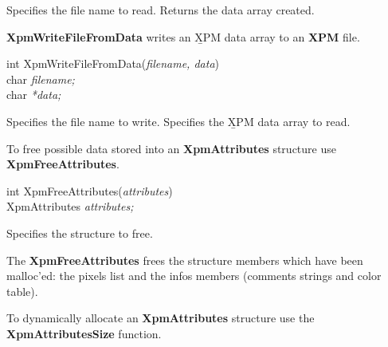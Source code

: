 \begin{description}

 Specifies the file name to read.
 Returns the data array created.

\end{description} 

\vspace{.5cm}
{\bf XpmWriteFileFromData} writes an {\b XPM} data array to an {\bf XPM} file.

\begin{flushleft} 

int XpmWriteFileFromData({\it filename, data})\\

\hspace{1cm}char {\it *filename;}\\
\hspace{1cm}char {\it **data;}

\end{flushleft}

\begin{description}

 Specifies the file name to write.
 Specifies the {\b XPM} data array to read.

\end{description} 

\vspace{.5cm}
To free possible data stored into an {\bf XpmAttributes} structure use {\bf
XpmFreeAttributes}.

\begin{flushleft} 

int XpmFreeAttributes({\it attributes})\\

\hspace{1cm}XpmAttributes {\it *attributes;}

\end{flushleft}

\begin{description}

 Specifies the structure to free.

\end{description}

The {\bf XpmFreeAttributes} frees the structure members which have been
malloc'ed: the pixels list and the infos members (comments strings and color
table).

\vspace{.5cm}
To dynamically allocate an {\bf XpmAttributes} structure use the {\bf
Xpm\-Attributes\-Size} function.

